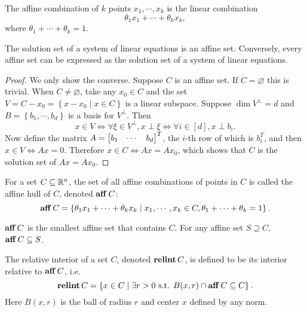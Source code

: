 \documentclass[12pt]{article}
\begin{document}
\begin{definition}
    The \textnormal{affine combination} of \(k\) points \(x_1,\cdots,x_k\) is the linear combination
    \[\theta_1x_1+\cdots+\theta_kx_k,\]
    where \(\theta_1+\cdots+\theta_k=1\).
\end{definition}

\begin{proposition}
    The solution set of a system of linear equations is an affine set. Conversely, every affine set can be expressed as the solution set of a system of linear equations.
\end{proposition}
\begin{proof}
    We only show the converse. Suppose \(C\) is an affine set. If \(C=\varnothing\) this is trivial. When \(C\neq\varnothing\), take any \(x_0\in C\) and the set \(V=C-x_0=\left\{x-x_0\mid x\in C\right\}\) is a linear subspace. Suppose \(\dim V^\perp=d\) and \(B=\left\{b_1,\cdots,b_d\right\}\) is a basis for \(V^\perp\). Then
    \[x\in V\iff \forall\xi\in V^\perp,x\perp\xi\iff \forall i\in[d],x\perp b_i.\]
    Now define the matrix \(A=\begin{bmatrix}b_1 & \cdots & b_d\end{bmatrix}^T\), the \(i\)-th row of which is \(b_i^T\), and then \(x\in V\iff Ax=0\). Therefore \(x\in C\iff Ax=Ax_0\), which shows that \(C\) is the solution set of \(Ax=Ax_0\).
\end{proof}

\begin{definition}
    For a set \(C\subseteq\mathbb R^n\), the set of all affine combinations of points in \(C\) is called the \textnormal{affine hull} of \(C\), denoted \(\operatorname{\mathbf{aff}} C\):
    \[\operatorname{\mathbf{aff}} C=\left\{\theta_1x_1+\cdots+\theta_kx_k\mid x_1,\cdots,x_k\in C,\theta_1+\cdots+\theta_k=1\right\}.\]
\end{definition}

\begin{remark}
    \(\operatorname{\mathbf{aff}} C\) is the smallest affine set that contains \(C\). For any affine set \(S\supseteq C\), \(\operatorname{\mathbf{aff}} C\subseteq S\).
\end{remark}

\begin{definition}
    The \textnormal{relative interior} of a set \(C\), denoted \(\operatorname{\mathbf{relint}} C\), is defined to be its interior relative to \(\operatorname{\mathbf{aff}} C\), i.e.
    \[\operatorname{\mathbf{relint}} C=\left\{x\in C\mid\exists r>0\textnormal{ s.t. } B(x,r)\cap\operatorname{\mathbf{aff}} C\subseteq C\right\}.\]
    Here \(B(x,r)\) is the ball of radius \(r\) and center \(x\) defined by any norm.
\end{definition}
\end{document}
